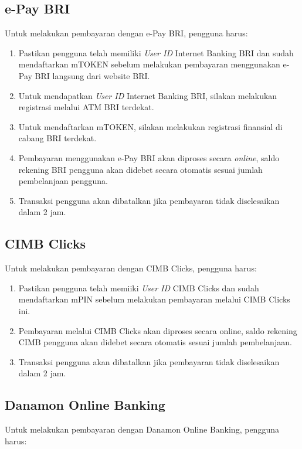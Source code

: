 \subsection{e-Pay BRI}
\label{subsec:epaybri}
Untuk melakukan pembayaran dengan e-Pay BRI, pengguna harus:

\begin{enumerate}
    \item Pastikan pengguna telah memiliki \textit{User ID} Internet Banking BRI dan sudah mendaftarkan mTOKEN sebelum melakukan pembayaran menggunakan e-Pay BRI langsung dari website BRI.
    \item Untuk mendapatkan \textit{User ID} Internet Banking BRI, silakan melakukan registrasi melalui ATM BRI terdekat.
    \item Untuk mendaftarkan mTOKEN, silakan melakukan registrasi finansial di cabang BRI terdekat.
    \item Pembayaran menggunakan e-Pay BRI akan diproses secara \textit{online}, saldo rekening BRI pengguna akan didebet secara otomatis sesuai jumlah pembelanjaan pengguna.
    \item Transaksi pengguna akan dibatalkan jika pembayaran tidak diselesaikan dalam 2 jam.
\end{enumerate}

\subsection{CIMB Clicks}
\label{subsec:cimbclicks}
Untuk melakukan pembayaran dengan CIMB Clicks, pengguna harus:

\begin{enumerate}
    \item Pastikan pengguna telah memiiki \textit{User ID} CIMB Clicks dan sudah mendaftarkan mPIN sebelum melakukan pembayaran melalui CIMB Clicks ini.
    \item Pembayaran melalui CIMB Clicks akan diproses secara online, saldo rekening CIMB pengguna akan didebet secara otomatis sesuai jumlah pembelanjaan.
    \item Transaksi pengguna akan dibatalkan jika pembayaran tidak diselesaikan dalam 2 jam.
\end{enumerate}

\subsection{Danamon Online Banking}
\label{subsec:danamononlinebanking}
Untuk melakukan pembayaran dengan Danamon Online Banking, pengguna harus:

